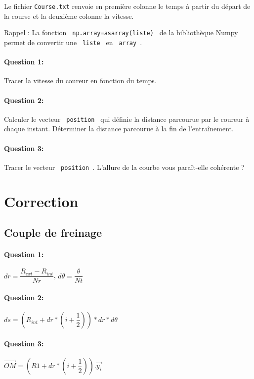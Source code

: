 Le fichier \texttt{Course.txt} renvoie en première colonne le temps à partir du départ de la course et la deuxième colonne la vitesse.

Rappel : La fonction \verb? np.array=asarray(liste) ? de la bibliothèque Numpy permet de convertir une \verb? liste ? en \verb? array ?.

\paragraph{Question 1:} Tracer la vitesse du coureur en fonction du temps. 

\paragraph{Question 2:} Calculer le vecteur \verb? position ? qui définie la distance parcourue par le coureur à chaque instant. Déterminer la distance parcourue à la fin de l’entraînement.

\paragraph{Question 3:} Tracer le vecteur \verb? position ?. L'allure de la courbe vous paraît-elle cohérente ?

\ifdef{\public}{}{}

\newpage

\pagestyle{correction}

\section{Correction}

\subsection{Couple de freinage}

\paragraph{Question 1:} $dr=\dfrac{R_{ext}-R_{int}}{Nr}$, $d\theta=\dfrac{\theta}{Nt}$

\paragraph{Question 2:} $ds=(R_{int}+dr*(i+\dfrac{1}{2}))*dr*d\theta$ 

\paragraph{Question 3:} $\overrightarrow{OM}=(R1+dr*(i+\dfrac{1}{2})).\overrightarrow{y_i}$

